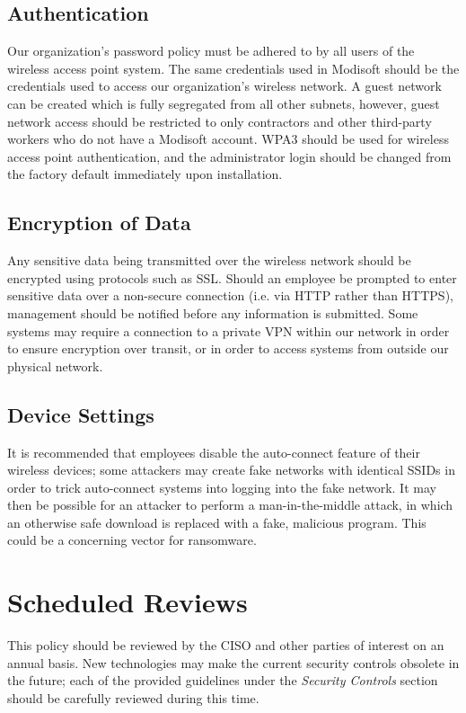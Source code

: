\documentclass[11pt]{article}
\begin{document}
\subsection{Authentication}
\label{sec:org94e1e1c}
Our organization's password policy must be adhered to by all users of the wireless access point system. The same credentials used in Modisoft should be the credentials used to access our organization's wireless network. A guest network can be created which is fully segregated from all other subnets, however, guest network access should be restricted to only contractors and other third-party workers who do not have a Modisoft account. WPA3 should be used for wireless access point authentication, and the administrator login should be changed from the factory default immediately upon installation.

\subsection{Encryption of Data}
\label{sec:org735dd5a}
Any sensitive data being transmitted over the wireless network should be encrypted using protocols such as SSL. Should an employee be prompted to enter sensitive data over a non-secure connection (i.e. via HTTP rather than HTTPS), management should be notified before any information is submitted. Some systems may require a connection to a private VPN within our network in order to ensure encryption over transit, or in order to access systems from outside our physical network.

\subsection{Device Settings}
\label{sec:org61f0f0e}
It is recommended that employees disable the auto-connect feature of their wireless devices; some attackers may create fake networks with identical SSIDs in order to trick auto-connect systems into logging into the fake network. It may then be possible for an attacker to perform a man-in-the-middle attack, in which an otherwise safe download is replaced with a fake, malicious program. This could be a concerning vector for ransomware.

\section{Scheduled Reviews}
\label{sec:org620096b}
This policy should be reviewed by the CISO and other parties of interest on an annual basis. New technologies may make the current security controls obsolete in the future; each of the provided guidelines under the \emph{Security Controls} section should be carefully reviewed during this time.
\end{document}
